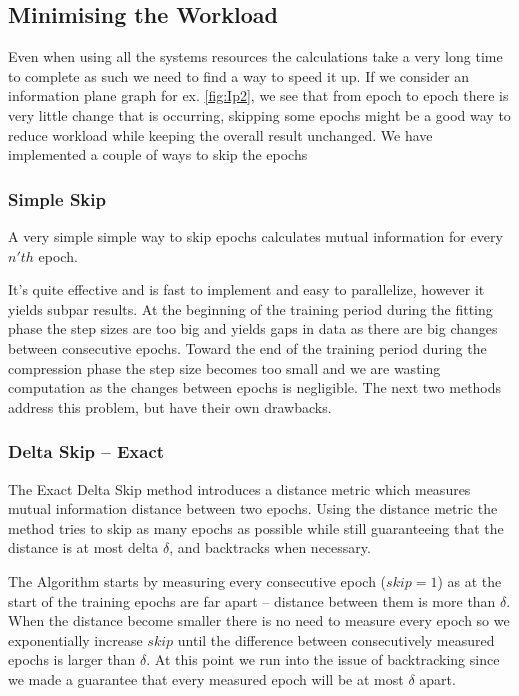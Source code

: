 \documentclass[dissertation.tex]{subfiles}
\begin{document}
\subsection{Minimising the Workload}

Even when using all the systems resources the calculations take a very long
time to complete as such we need to find a way to speed it up. If we consider an
information plane graph for ex. \autoref{fig:Ip2}, we see that from epoch to
epoch there is very little change that is occurring, skipping some epochs might
be a good way to reduce workload while keeping the overall result unchanged. We
have implemented a couple of ways to skip the epochs 

\subsubsection{Simple Skip}
  
  A very simple simple way to skip epochs calculates mutual information for
  every $n'th$ epoch.

  It's quite effective and is fast to implement and easy to parallelize, however
  it yields subpar results. At the beginning of the training period during the
  fitting phase the step sizes are too big and yields gaps in data as there are
  big changes between consecutive epochs. Toward the end of the training period
  during the compression phase the step size becomes too small and we are
  wasting computation as the changes between epochs is negligible. The next two
  methods address this problem, but have their own drawbacks.

\subsubsection{Delta Skip -- Exact}

  The Exact Delta Skip method introduces a distance metric which measures
  mutual information distance between two epochs. Using the distance metric the
  method tries to skip as many epochs as possible while still guaranteeing that
  the distance is at most delta $\delta$, and backtracks when necessary.

  The Algorithm starts by measuring every consecutive epoch ($skip = 1$) as at
  the start of the training epochs are far apart -- distance between them is
  more than $\delta$. When the distance become smaller there is no need to
  measure every epoch so we exponentially increase $skip$ until the difference
  between consecutively measured epochs is larger than $\delta$. At this point
  we run into the issue of backtracking since we made a guarantee that every
  measured epoch will be at most $\delta$ apart.
\end{document}
